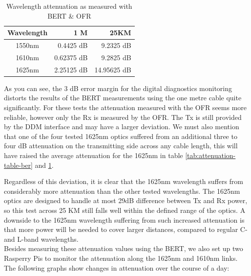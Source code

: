 \documentclass{article}
\begin{document}
\begin{table}[h]
\centering
\label{tab:attenuation-table-ofr}
\begin{tabular}{|c|r|r|}
\hline 
\textbf{Wavelength} & \textbf{1 M} & \textbf{25KM}\\ 
\hline 
1550nm & 0.4425 dB & 9.2325 dB\\ 
\hline 
1610nm & 0.62375 dB & 9.2825 dB\\ 
\hline 
1625nm & 2.25125 dB & 14.95625 dB\\
\hline
\end{tabular}
\caption{Wavelength attenuation as measured with BERT \& OFR}
\end{table}

As you can see, the 3 dB error margin for the digital diagnostics monitoring distorts the results of the BERT measurements using the one metre cable quite significantly.
For these tests the attenuation measured with the OFR seems more reliable, however only the Rx is measured by the OFR.
The Tx is still provided by the DDM interface and may have a larger deviation.
We must also mention that one of the four tested 1625nm optics suffered from an additional three to four dB attenuation on the transmitting side across any cable length, this will have raised the average attenuation for the 1625nm in table \ref{tab:attenuation-table-ber} and \ref{tab:attenuation-table-ofr}.

Regardless of this deviation, it is clear that the 1625nm wavelength suffers from considerably more attenuation than the other tested wavelengths.
The 1625nm optics are designed to handle at most 29dB difference between Tx and Rx power, so this test across 25 KM still falls well within the defined range of the optics.
A downside to the 1625nm wavelength suffering from such increased attenuation is that more power will be needed to cover larger distances, compared to regular C- and L-band wavelengths. \\

Besides measuring these attenuation values using the BERT, we also set up two Rasperry Pis to monitor the attenuation along the 1625nm and 1610nm links.
The following graphs show changes in attenuation over the course of a day:\\
\end{document}
